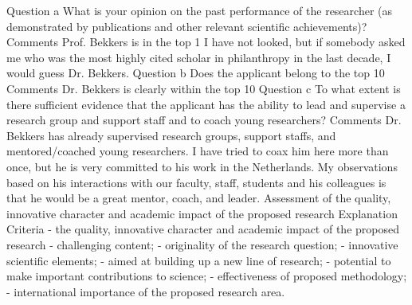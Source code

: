 \documentclass[twocolumn, serif, rga, numeric]{jote-article}
\begin{document}
Question a
What is your opinion on the past performance of the researcher (as demonstrated by publications and other relevant scientific achievements)?
Comments
Prof. Bekkers is in the top 1%
I have not looked, but if somebody asked me who was the most highly cited scholar in philanthropy in the last decade, I would guess Dr. Bekkers.
Question b
Does the applicant belong to the top 10%
Comments
Dr. Bekkers is clearly within the top 10%
Question c
To what extent is there sufficient evidence that the applicant has the ability to lead and supervise a research group and support staff and to coach young researchers?
Comments
Dr. Bekkers has already supervised research groups, support staffs, and mentored/coached young researchers. I have tried to coax him here more than once, but he is very committed to his work in the Netherlands. My observations based on his interactions with our faculty, staff, students and his colleagues is that he would be a great mentor, coach, and leader.
Assessment of the quality, innovative character and academic impact of the proposed research
Explanation
Criteria - the quality, innovative character and academic impact of the proposed research - challenging content; - originality of the research question; - innovative scientific elements; - aimed at building up a new line of research; - potential to make important contributions to science; - effectiveness of proposed methodology; - international importance of the proposed research area.
\end{document}
